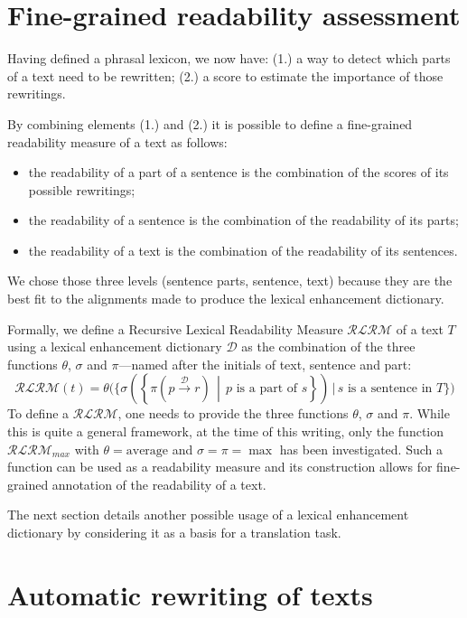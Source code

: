 \documentclass[a4paper, 11pt, onepage]{scrreprt}
\newcommand\maps[1]{\xrightarrow{\mathcal{#1}}}
\newcommand\suchthat{\, \middle| \,}
\begin{document}
\section{Fine-grained readability assessment}
\label{sec:fine-grain-read}

Having defined a phrasal lexicon, we now have: (1.) a way to detect
which parts of a text need to be rewritten; (2.) a score to estimate
the importance of those rewritings.

By combining elements (1.) and (2.) it is possible to define a
fine-grained readability measure of a text as follows:

\begin{itemize}
\item the readability of a part of a sentence is the combination of
  the scores of its possible rewritings;
\item the readability of a sentence is the combination of the
  readability of its parts;
\item the readability of a text is the combination of the readability
  of its sentences.
\end{itemize}

We chose those three levels (sentence parts, sentence, text) because
they are the best fit to the alignments made to produce the lexical
enhancement dictionary.

Formally, we define a Recursive Lexical Readability Measure
$\mathcal{RLRM}$ of a text $T$ using a lexical enhancement dictionary
$\mathcal{D}$ as the combination of the three functions $\theta$,
$\sigma$ and $\pi$—named after the initials of text, sentence and
part:
\[
\mathcal{RLRM}(t) = \theta\Bigg(\Bigg\{ \sigma \left(\left\{ \pi(p
    \maps{D} r) \suchthat \text{$p$ is a part of $s$}\right\}\right)
\,\Bigg|\, \text{$s$ is a sentence in $T$} \Bigg\}\Bigg)
\]
To define a $\mathcal{RLRM}$, one needs to provide the three functions
$\theta$, $\sigma$ and $\pi$. While this is quite a general framework,
at the time of this writing, only the function $\mathcal{RLRM}_{max}$
with $\theta = \text{average}$ and $\sigma = \pi = \max$ has been
investigated. Such a function can be used as a readability measure and
its construction allows for fine-grained annotation of the readability
of a text.

The next section details another possible usage of a lexical
enhancement dictionary by considering it as a basis for a translation
task.

\section{Automatic rewriting of texts}
\label{sec:rewriting}
\end{document}
